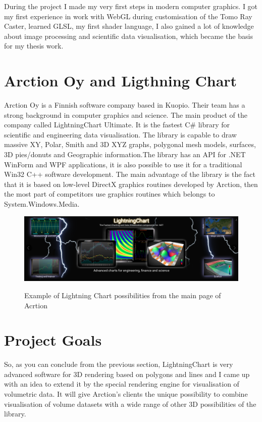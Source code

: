 \documentclass[english, 11pt]{report}
\begin{document}
During the project I made my very first steps in modern computer graphics. I got my first experience in work with WebGL during customisation of the Tomo Ray Caster, learned GLSL, my first shader language, I also gained a lot of knowledge about image processing and scientific data visualisation, which became the basis for my thesis work.


\section{Arction Oy and Ligthning Chart}

Arction Oy is a Finnish software company based in Kuopio. Their team has a strong background in computer graphics and science. The main product of the company called LightningChart Ultimate. It is the fastest C\# library for scientific and engineering data visualisation. The library is capable to draw massive XY, Polar, Smith and 3D XYZ graphs, polygonal mesh models, surfaces, 3D pies/donuts and Geographic information.The library has an API for .NET WinForm and WPF applications, it is also possible to use it for a traditional Win32 C++ software development. The main advantage of the library is the fact that it is based on low-level DirectX graphics routines developed by Arction, then the most part of competitors use graphics routines which belongs to System.Windows.Media.\\
\begin{figure}[H]
\includegraphics[scale=0.33]{img/lchu}\\
\caption{Example of Lightning Chart possibilities from the main page of Acrtion}
\end{figure}

\section{Project Goals}

So, as you can conclude from the previous section, LightningChart is very advanced software for 3D rendering based on polygons and lines and I came up with an idea to extend it by the special rendering engine for visualisation of volumetric data. It will give Arction's clients the unique possibility to combine visualisation of volume datasets with a wide range of other 3D possibilities of the library. \\
\end{document}

